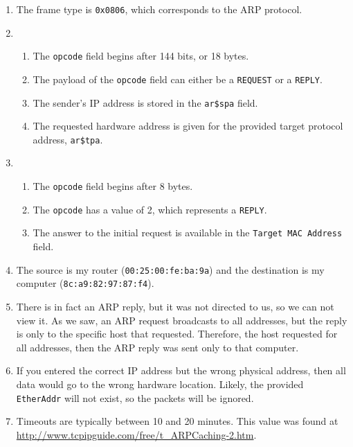 \documentclass[11pt]{article}
\begin{document}
\begin{enumerate}
  \item The frame type is \texttt{0x0806}, which corresponds to the ARP
    protocol.

  \item
    \begin{enumerate}
      \item The \texttt{opcode} field begins after 144 bits, or 18 bytes.
      \item The payload of the \texttt{opcode} field can either be a
        \texttt{REQUEST} or a \texttt{REPLY}.
      \item The sender's IP address is stored in the \texttt{ar\$spa} field.
      \item The requested hardware address is given for the provided target
        protocol address, \texttt{ar\$tpa}.
    \end{enumerate}

  \item
    \begin{enumerate}
      \item The \texttt{opcode} field begins after 8 bytes.
      \item The \texttt{opcode} has a value of 2, which represents a
        \texttt{REPLY}.
      \item The answer to the initial request is available in the \texttt{Target
        MAC Address} field.
    \end{enumerate}

  \item The source is my router (\texttt{00:25:00:fe:ba:9a}) and the destination
    is my computer (\texttt{8c:a9:82:97:87:f4}).

  \item There is in fact an ARP reply, but it was not directed to us, so we can
    not view it.  As we saw, an ARP request broadcasts to all addresses, but the
    reply is only to the specific host that requested.  Therefore, the host
    requested for all addresses, then the ARP reply was sent only to that
    computer.

  \item If you entered the correct IP address but the wrong physical address,
    then all data would go to the wrong hardware location.  Likely, the provided
    \texttt{EtherAddr} will not exist, so the packets will be ignored.

  \item Timeouts are typically between 10 and 20 minutes.  This value was found
    at \url{http://www.tcpipguide.com/free/t_ARPCaching-2.htm}.

\end{enumerate}
\end{document}

